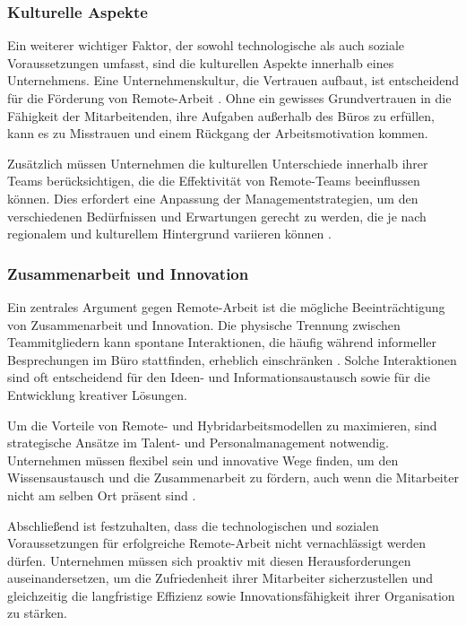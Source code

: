 \subsubsection{Kulturelle Aspekte}  
Ein weiterer wichtiger Faktor, der sowohl technologische als auch soziale Voraussetzungen umfasst, sind die kulturellen Aspekte innerhalb eines Unternehmens. Eine Unternehmenskultur, die Vertrauen aufbaut, ist entscheidend für die Förderung von Remote-Arbeit \cite{7}. Ohne ein gewisses Grundvertrauen in die Fähigkeit der Mitarbeitenden, ihre Aufgaben außerhalb des Büros zu erfüllen, kann es zu Misstrauen und einem Rückgang der Arbeitsmotivation kommen.

Zusätzlich müssen Unternehmen die kulturellen Unterschiede innerhalb ihrer Teams berücksichtigen, die die Effektivität von Remote-Teams beeinflussen können. Dies erfordert eine Anpassung der Managementstrategien, um den verschiedenen Bedürfnissen und Erwartungen gerecht zu werden, die je nach regionalem und kulturellem Hintergrund variieren können \cite{7}.

\subsubsection{Zusammenarbeit und Innovation}  
Ein zentrales Argument gegen Remote-Arbeit ist die mögliche Beeinträchtigung von Zusammenarbeit und Innovation. Die physische Trennung zwischen Teammitgliedern kann spontane Interaktionen, die häufig während informeller Besprechungen im Büro stattfinden, erheblich einschränken \cite{7}. Solche Interaktionen sind oft entscheidend für den Ideen- und Informationsaustausch sowie für die Entwicklung kreativer Lösungen. 

Um die Vorteile von Remote- und Hybridarbeitsmodellen zu maximieren, sind strategische Ansätze im Talent- und Personalmanagement notwendig. Unternehmen müssen flexibel sein und innovative Wege finden, um den Wissensaustausch und die Zusammenarbeit zu fördern, auch wenn die Mitarbeiter nicht am selben Ort präsent sind \cite{7}.

Abschließend ist festzuhalten, dass die technologischen und sozialen Voraussetzungen für erfolgreiche Remote-Arbeit nicht vernachlässigt werden dürfen. Unternehmen müssen sich proaktiv mit diesen Herausforderungen auseinandersetzen, um die Zufriedenheit ihrer Mitarbeiter sicherzustellen und gleichzeitig die langfristige Effizienz sowie Innovationsfähigkeit ihrer Organisation zu stärken.
